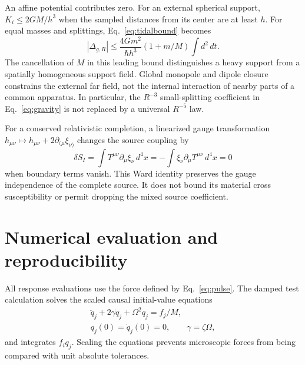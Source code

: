 An affine potential contributes zero. For an external spherical support, $K_i\le2GM/h^3$ when the sampled distances from its center are at least $h$. For equal masses and splittings, Eq.~\eqref{eq:tidalbound} becomes
\begin{equation}
|\Delta_{g,R}|\le\frac{4Gm^2}{\hbar h^3}(1+m/M)\int d^2\,dt.
\label{eq:sphericalbound}
\end{equation}
The cancellation of $M$ in this leading bound distinguishes a heavy support from a spatially homogeneous support field. Global monopole and dipole closure constrains the external far field, not the internal interaction of nearby parts of a common apparatus. In particular, the $R^{-3}$ small-splitting coefficient in Eq.~\eqref{eq:gravity} is not replaced by a universal $R^{-5}$ law.

For a conserved relativistic completion, a linearized gauge transformation $h_{\mu\nu}\mapsto h_{\mu\nu}+2\partial_{(\mu}\xi_{\nu)}$ changes the source coupling by
\begin{equation}
\delta S_I=\int T^{\mu\nu}\partial_\mu\xi_\nu\,d^4x
=-\int\xi_\nu\partial_\mu T^{\mu\nu}\,d^4x=0
\label{eq:Ward}
\end{equation}
when boundary terms vanish. This Ward identity \cite{Danielson,Christodoulou} preserves the gauge independence of the complete source. It does not bound its material cross susceptibility or permit dropping the mixed source coefficient.

\section{Numerical evaluation and reproducibility}\label{app:numerics}
All response evaluations use the force defined by Eq.~\eqref{eq:pulse}. The damped test calculation solves the scaled causal initial-value equations
\begin{equation}
\begin{gathered}
\ddot q_j+2\gamma\dot q_j+\Omega^2q_j=f_j/M,\\
q_j(0)=\dot q_j(0)=0,\qquad\gamma=\zeta\Omega,
\end{gathered}
\label{eq:ode}
\end{equation}
and integrates $f_iq_j$. Scaling the equations prevents microscopic forces from being compared with unit absolute tolerances.


